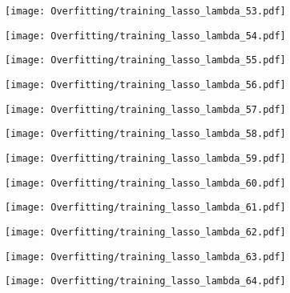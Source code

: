 \documentclass[xcolor=pdftex,dvipsnames,table]{beamer}
\begin{document}
\frame
{
	\begin{center}
		\texttt{[image: Overfitting/training\_lasso\_lambda\_53.pdf]}
	\end{center}
}

\frame
{
	\begin{center}
		\texttt{[image: Overfitting/training\_lasso\_lambda\_54.pdf]}
	\end{center}
}

\frame
{
	\begin{center}
		\texttt{[image: Overfitting/training\_lasso\_lambda\_55.pdf]}
	\end{center}
}

\frame
{
	\begin{center}
		\texttt{[image: Overfitting/training\_lasso\_lambda\_56.pdf]}
	\end{center}
}

\frame
{
	\begin{center}
		\texttt{[image: Overfitting/training\_lasso\_lambda\_57.pdf]}
	\end{center}
}

\frame
{
	\begin{center}
		\texttt{[image: Overfitting/training\_lasso\_lambda\_58.pdf]}
	\end{center}
}

\frame
{
	\begin{center}
		\texttt{[image: Overfitting/training\_lasso\_lambda\_59.pdf]}
	\end{center}
}

\frame
{
	\begin{center}
		\texttt{[image: Overfitting/training\_lasso\_lambda\_60.pdf]}
	\end{center}
}

\frame
{
	\begin{center}
		\texttt{[image: Overfitting/training\_lasso\_lambda\_61.pdf]}
	\end{center}
}

\frame
{
	\begin{center}
		\texttt{[image: Overfitting/training\_lasso\_lambda\_62.pdf]}
	\end{center}
}

\frame
{
	\begin{center}
		\texttt{[image: Overfitting/training\_lasso\_lambda\_63.pdf]}
	\end{center}
}

\frame
{
	\begin{center}
		\texttt{[image: Overfitting/training\_lasso\_lambda\_64.pdf]}
	\end{center}
}
\end{document}
